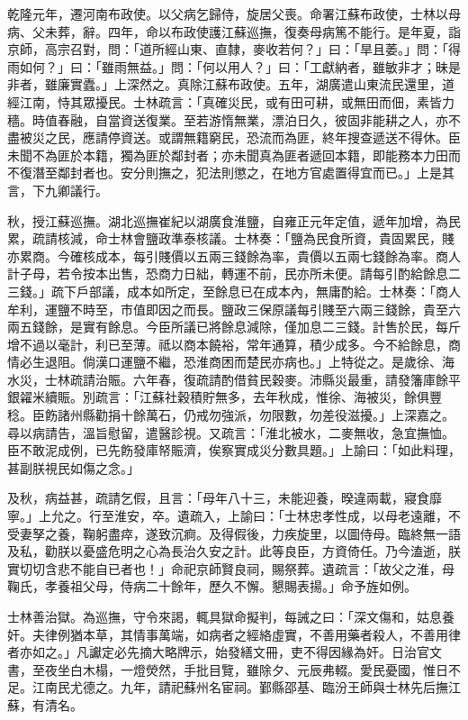 \begin{pinyinscope}
乾隆元年，遷河南布政使。以父病乞歸侍，旋居父喪。命署江蘇布政使，士林以母病、父未葬，辭。四年，命以布政使護江蘇巡撫，復奏母病篤不能行。是年夏，詣京師，高宗召對，問：「道所經山東、直隸，麥收若何？」曰：「旱且萎。」問：「得雨如何？」曰：「雖雨無益。」問：「何以用人？」曰：「工獻納者，雖敏非才；昧是非者，雖廉實蠹。」上深然之。真除江蘇布政使。五年，湖廣遣山東流民還里，道經江南，恃其眾擾民。士林疏言：「真確災民，或有田可耕，或無田而佃，素皆力穡。時值春融，自當資送復業。至若游惰無業，漂泊日久，彼固非能耕之人，亦不盡被災之民，應請停資送。或謂無籍窮民，恐流而為匪，終年搜查遞送不得休。臣未聞不為匪於本籍，獨為匪於鄰封者；亦未聞真為匪者遞回本籍，即能務本力田而不復潛至鄰封者也。安分則撫之，犯法則懲之，在地方官處置得宜而已。」上是其言，下九卿議行。

秋，授江蘇巡撫。湖北巡撫崔紀以湖廣食淮鹽，自雍正元年定值，遞年加增，為民累，疏請核減，命士林會鹽政準泰核議。士林奏：「鹽為民食所資，貴固累民，賤亦累商。今確核成本，每引賤價以五兩三錢餘為率，貴價以五兩七錢餘為率。商人計子母，若令按本出售，恐商力日絀，轉運不前，民亦所未便。請每引酌給餘息二三錢。」疏下戶部議，成本如所定，至餘息已在成本內，無庸酌給。士林奏：「商人牟利，運鹽不時至，巿值即因之而長。鹽政三保原議每引賤至六兩三錢餘，貴至六兩五錢餘，是實有餘息。今臣所議已將餘息減除，僅加息二三錢。計售於民，每斤增不過以毫計，利已至薄。祗以商本饒裕，常年通算，積少成多。今不給餘息，商情必生退阻。倘漢口運鹽不繼，恐淮商困而楚民亦病也。」上特從之。是歲徐、海水災，士林疏請治賑。六年春，復疏請酌借貧民穀麥。沛縣災最重，請發籓庫餘平銀糴米續賑。別疏言：「江蘇社穀積貯無多，去年秋成，惟徐、海被災，餘俱豐稔。臣飭諸州縣勸捐十餘萬石，仍戒勿強派，勿限數，勿差役滋擾。」上深嘉之。尋以病請告，溫旨慰留，遣醫診視。又疏言：「淮北被水，二麥無收，急宜撫恤。臣不敢泥成例，已先飭發庫帑賑濟，俟察實成災分數具題。」上諭曰：「如此料理，甚副朕視民如傷之念。」

及秋，病益甚，疏請乞假，且言：「母年八十三，未能迎養，暌違兩載，寢食靡寧。」上允之。行至淮安，卒。遺疏入，上諭曰：「士林忠孝性成，以母老遠離，不受妻孥之養，鞠躬盡瘁，遂致沉痾。及得假後，力疾旋里，以圖侍母。臨終無一語及私，勸朕以憂盛危明之心為長治久安之計。此等良臣，方資倚任。乃今溘逝，朕實切切含悲不能自已者也！」命祀京師賢良祠，賜祭葬。遺疏言：「故父之淮，母鞠氏，孝養祖父母，侍病二十餘年，歷久不懈。懇賜表揚。」命予旌如例。

士林善治獄。為巡撫，守令來謁，輒具獄命擬判，每誡之曰：「深文傷和，姑息養奸。夫律例猶本草，其情事萬端，如病者之經絡虛實，不善用藥者殺人，不善用律者亦如之。」凡讞定必先摘大略牌示，始發繕文冊，吏不得因緣為奸。日治官文書，至夜坐白木榻，一燈熒然，手批目覽，雖除夕、元辰弗輟。愛民憂國，惟日不足。江南民尤德之。九年，請祀蘇州名宦祠。鄞縣邵基、臨汾王師與士林先后撫江蘇，有清名。


\end{pinyinscope}
